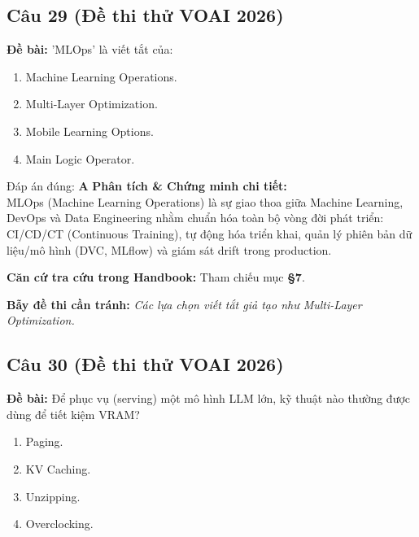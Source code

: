 \documentclass[10pt,a4paper]{article}
\begin{document}
\subsection*{Câu 29 (Đề thi thử VOAI 2026)}
\textbf{Đề bài:} 'MLOps' là viết tắt của:

\begin{enumerate}[label=\textbf{\Alph*.}]
    \item Machine Learning Operations.
    \item Multi-Layer Optimization.
    \item Mobile Learning Options.
    \item Main Logic Operator.
\end{enumerate}

\begin{solbox}{Đáp án đúng: \textbf{A}}
\textbf{Phân tích \& Chứng minh chi tiết:} \\
MLOps (Machine Learning Operations) là sự giao thoa giữa Machine Learning, DevOps và Data Engineering nhằm chuẩn hóa toàn bộ vòng đời phát triển: CI/CD/CT (Continuous Training), tự động hóa triển khai, quản lý phiên bản dữ liệu/mô hình (DVC, MLflow) và giám sát drift trong production.

\vspace{0.4em}
\textbf{Căn cứ tra cứu trong Handbook:} Tham chiếu mục \textbf{§7}.

\vspace{0.4em}
\textbf{Bẫy đề thi cần tránh:} \textit{Các lựa chọn viết tắt giả tạo như Multi-Layer Optimization.}
\end{solbox}
\vspace{0.5em}


\subsection*{Câu 30 (Đề thi thử VOAI 2026)}
\textbf{Đề bài:} Để phục vụ (serving) một mô hình LLM lớn, kỹ thuật nào thường được dùng để tiết kiệm VRAM?

\begin{enumerate}[label=\textbf{\Alph*.}]
    \item Paging.
    \item KV Caching.
    \item Unzipping.
    \item Overclocking.
\end{enumerate}
\end{document}

